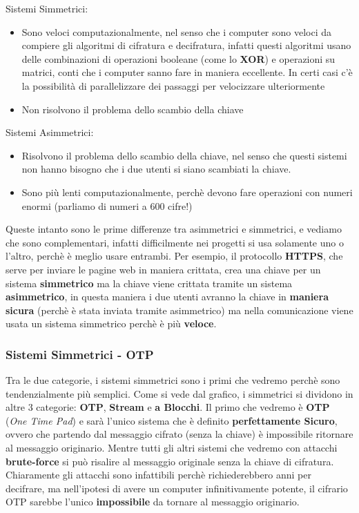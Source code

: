 \documentclass{report}
\begin{document}
Sistemi Simmetrici:

\begin{itemize}
    \item Sono veloci computazionalmente, nel senso che i computer sono veloci da compiere gli algoritmi di cifratura e decifratura, infatti questi algoritmi usano delle combinazioni di operazioni booleane (come lo \textbf{XOR}) e operazioni su matrici, conti che i computer sanno fare in maniera eccellente. In certi casi c'è la possibilità di parallelizzare dei passaggi per velocizzare ulteriormente
    \item Non risolvono il problema dello scambio della chiave 
\end{itemize}

Sistemi Asimmetrici:

\begin{itemize}
    \item Risolvono il problema dello scambio della chiave, nel senso che questi sistemi non hanno bisogno che i due utenti si siano scambiati la chiave.
    \item Sono più lenti computazionalmente, perchè devono fare operazioni con numeri enormi (parliamo di numeri a 600 cifre!)
\end{itemize}


Queste intanto sono le prime differenze tra asimmetrici e simmetrici, e vediamo che sono complementari, infatti difficilmente nei progetti si usa solamente uno o l'altro, perchè è meglio usare entrambi. Per esempio, il protocollo \textbf{HTTPS}, che serve per inviare le pagine web in maniera crittata, crea una chiave per un sistema \textbf{simmetrico} ma la chiave viene crittata tramite un sistema \textbf{asimmetrico}, in questa maniera i due utenti avranno la chiave in \textbf{maniera sicura} (perchè è stata inviata tramite asimmetrico) ma nella comunicazione viene usata un sistema simmetrico perchè è più \textbf{veloce}.

\subsubsection{Sistemi Simmetrici - OTP}

Tra le due categorie, i sistemi simmetrici sono i primi che vedremo perchè sono tendenzialmente più semplici. Come si vede dal grafico, i simmetrici si dividono in altre 3 categorie: \textbf{OTP}, \textbf{Stream} e \textbf{a Blocchi}. Il primo che vedremo è \textbf{OTP} (\textit{One Time Pad}) e sarà l'unico sistema che è definito \textbf{perfettamente Sicuro}, ovvero che partendo dal messaggio cifrato (senza la chiave) è impossibile ritornare al messaggio originario. Mentre tutti gli altri sistemi che vedremo con attacchi \textbf{brute-force} si può risalire al messaggio originale senza la chiave di cifratura. Chiaramente gli attacchi sono infattibili perchè richiederebbero anni per decifrare, ma nell'ipotesi di avere un computer infinitivamente potente, il cifrario OTP sarebbe l'unico \textbf{impossibile} da tornare al messaggio originario. 
\end{document}
